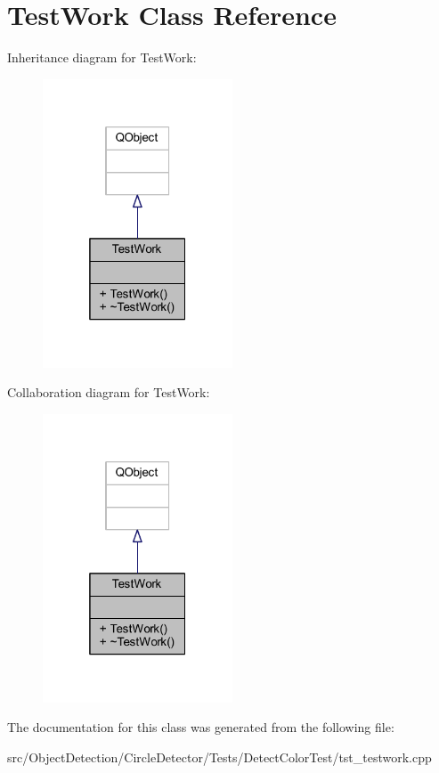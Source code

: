 \hypertarget{class_test_work}{}\section{Test\+Work Class Reference}
\label{class_test_work}


Inheritance diagram for Test\+Work\+:\nopagebreak
\begin{figure}[H]
\begin{center}
\leavevmode
\includegraphics[width=160pt]{d8/dc0/class_test_work__inherit__graph}
\end{center}
\end{figure}


Collaboration diagram for Test\+Work\+:\nopagebreak
\begin{figure}[H]
\begin{center}
\leavevmode
\includegraphics[width=160pt]{d0/d00/class_test_work__coll__graph}
\end{center}
\end{figure}


The documentation for this class was generated from the following file\+:\begin{DoxyCompactItemize}
\item 
src/\+Object\+Detection/\+Circle\+Detector/\+Tests/\+Detect\+Color\+Test/tst\+\_\+testwork.\+cpp\end{DoxyCompactItemize}
